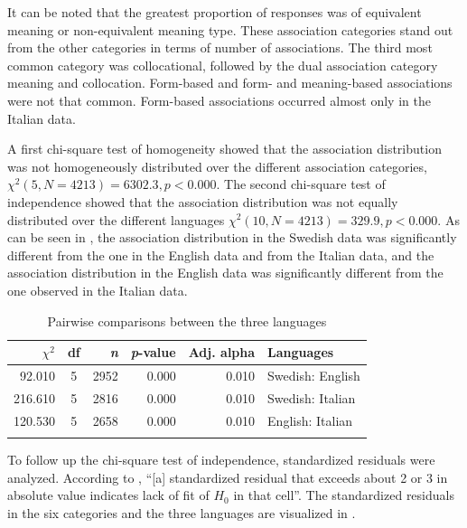 \documentclass[output=paper,colorlinks,citecolor=brown,nonflat]{langsci/langscibook}
\begin{document}
It can be noted that the greatest proportion of responses was of equivalent meaning or non-equivalent meaning type. These association categories stand out from the other categories in terms of number of associations. The third most common category was collocational, followed by the dual association category meaning and collocation. Form-based and form- and meaning-based associations were not that common. Form-based associations occurred almost only in the Italian data.

A first chi-square test of homogeneity showed that the association distribution was not homogeneously distributed over the different association categories, $\chi^2 (5, N = 4213) = 6302.3, p <0.000$. The second chi-square test of independence showed that the association distribution was not equally distributed over the different languages  $\chi^2(10, N = 4213) = 329.9, p <0.000$. As can be seen in , the association distribution in the Swedish data was significantly different from the one in the English data and from the Italian data, and the association distribution in the English data was significantly different from the one observed in the Italian data.

\begin{table}[p]
    \begin{tabular}{rcrrrl}
    \lsptoprule
         $\chi^2$ & df & \textit{n} & \textit{p}-value & Adj. alpha & Languages\\
    \midrule
        92.010 & 5 & 2952 & 0.000 & 0.010 & Swedish: English\\
        216.610 & 5 & 2816 & 0.000 & 0.010 & Swedish: Italian\\
        120.530 & 5 & 2658 & 0.000 & 0.010 & English: Italian\\
    \lspbottomrule
    \end{tabular}
    \caption{Pairwise comparisons between the three languages}
    \label{tab:gudmundson:3}
\end{table}

To follow up the chi-square test of independence, standardized residuals were analyzed. According to \citet[81]{Agresti2013}, “[a] standardized residual that exceeds about 2 or 3 in absolute value indicates lack of fit of $H_0$ in that cell”. The standardized residuals in the six categories and the three languages are visualized in .
\end{document}
